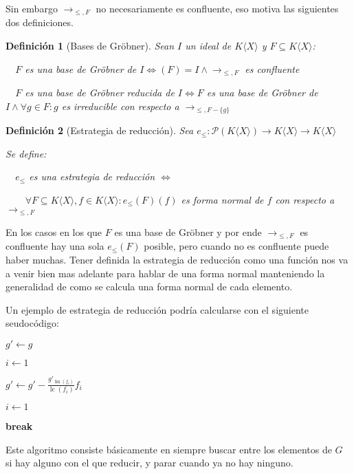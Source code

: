 \documentclass{amsbook}
\theoremstyle{customstyle}
\newtheorem{definition}{Definición}[section]
\DeclareMathOperator{\sop}{sop}
\DeclareMathOperator{\lm}{lm}
\DeclareMathOperator{\lc}{lc}
\begin{document}
Sin embargo $→_{≤, F}$ no necesariamente es confluente, eso motiva las siguientes dos definiciones.

\begin{definition}[Bases de Gröbner]
Sean $I$ un ideal de $K⟨X⟩$ y $F ⊆ K⟨X⟩$:

  $F$ es una base de Gröbner de $I ⇔ (F) = I ∧ →_{≤, F}$ es confluente

  $F$ es una base de Gröbner reducida de $I ⇔ F$ es una base de Gröbner de $I ∧ ∀g ∈ F : g$ es irreducible con respecto a $→_{≤, F - \{g\}}$

\end{definition}

\begin{definition}[Estrategia de reducción]
Sea $e_≤ : 𝒫(K⟨X⟩) → K⟨X⟩ → K⟨X⟩$

Se define:

  $e_≤$ es una estrategia de reducción $⇔$

    $∀F ⊆ K⟨X⟩, f ∈ K⟨X⟩ : e_≤(F)(f)$ es forma normal de $f$ con respecto a $→_{≤, F}$
\end{definition}

En los casos en los que $F$ es una base de Gröbner y por ende $→_{≤, F}$ es confluente hay una sola $e_≤(F)$ posible, pero cuando no es confluente puede haber muchas. Tener definida la estrategia de reducción como una función nos va a venir bien mas adelante para hablar de una forma normal manteniendo la generalidad de como se calcula una forma normal de cada elemento.

Un ejemplo de estrategia de reducción podría calcularse con el siguiente seudocódigo:

\begin{algorithm}[H] %
  \caption{Ejemplo de estrategia de reducción}\label{alg:estrategia de reducción}
  $g' ← g$

  $i ← 1$

   {
     {
      \If{$f_i ∈ \sop(g')$} {
        $g' ← g' - \frac{g'_{\lm(f_i)}}{\lc(f_i)}f_i$

        $i ← 1$

        \textbf{break}
      }
    }
  }
\end{algorithm}

Este algoritmo consiste básicamente en siempre buscar entre los elementos de $G$ si hay alguno con el que reducir, y parar cuando ya no hay ninguno.
\end{document}
